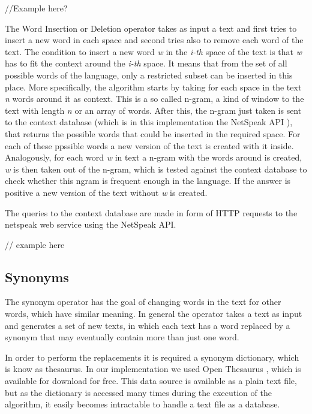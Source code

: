 \documentclass{reportAlternative}
\begin{document}
//Example here? \par

The Word Insertion or Deletion operator takes as input a text and first tries to insert a new word in each space and second tries also to remove each word of the text. The condition to insert a new word \emph{w} in the \emph{i-th} space of the text is that \emph{w} has to fit the context around the \emph{i-th} space. It means that from the set of all possible words of the language, only a restricted subset can be inserted in this place. More specifically, the algorithm starts by taking for each space in the text \emph{n} words around it as context. This is a so called n-gram, a kind of window to the text with length \emph{n} or an array of words. After this, the n-gram just taken is sent to the context database (which is in this implementation the NetSpeak API \cite{Netspeak}), that returns the possible words that could be inserted in the required space. For each of these ppssible words a new version of the text is created with it inside. Analogously, for each word \emph{w} in text a n-gram with the words around is created, \emph{w} is then taken out of the n-gram, which is tested against the context database to check whether this ngram is frequent enough in the language. If the answer is positive a new version of the text without \emph{w} is created. \par

The queries to the context database are made in form of HTTP requests to the netspeak web service using the NetSpeak API. \par
// example here

\subsection{Synonyms}
The synonym operator has the goal of changing words in the text for other words, which have similar meaning. In general the operator takes a text as input and generates a set of new texts, in which each text has a word replaced by a synonym that may eventually contain more than just one word.

In order to perform the replacements it is required a synonym dictionary, which is know as thesaurus. In our implementation we used Open Thesaurus \cite{OpenThesuarus}, which is available for download for free. This data source is available as a plain text file, but as the dictionary is accessed many times during the execution of the algorithm, it easily becomes intractable to handle a text file as a database.
\end{document}
